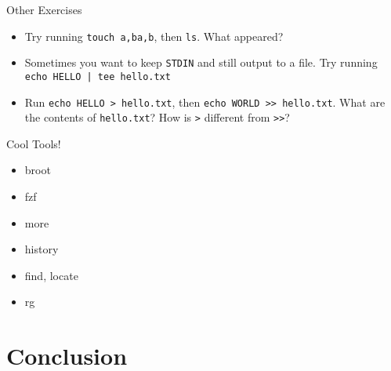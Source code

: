\documentclass[12pt]{beamer}
\begin{document}
\begin{frame}{Other Exercises}
  \begin{itemize}
    \item Try running \texttt{touch {a,b}{a,b}}, then \texttt{ls}. What appeared?
    \item Sometimes you want to keep \texttt{STDIN} and still output to a file. Try running \texttt{echo HELLO | tee hello.txt}
    \item Run \texttt{echo HELLO > hello.txt}, then \texttt{echo WORLD >> hello.txt}. What are the contents of \texttt{hello.txt}? How is \texttt{>} different from \texttt{>>}?
  \end{itemize}
\end{frame}

\begin{frame}{Cool Tools!}
  \begin{itemize}
    \item broot
    \item fzf
    \item more
    \item history
    \item find, locate
    \item rg
  \end{itemize}
\end{frame}

\section{Conclusion}
\end{document}
